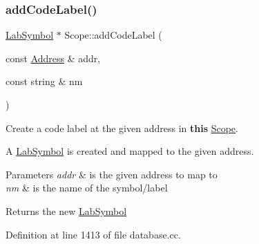 \subsubsection{\texorpdfstring{addCodeLabel()}{addCodeLabel()}}
{\footnotesize\ttfamily \mbox{\hyperlink{class_lab_symbol}{Lab\+Symbol}} $\ast$ Scope\+::add\+Code\+Label (\begin{DoxyParamCaption}\item[{const \mbox{\hyperlink{class_address}{Address}} \&}]{addr,  }\item[{const string \&}]{nm }\end{DoxyParamCaption})}



Create a code label at the given address in {\bfseries{this}} \mbox{\hyperlink{class_scope}{Scope}}. 

A \mbox{\hyperlink{class_lab_symbol}{Lab\+Symbol}} is created and mapped to the given address. 
\begin{DoxyParams}{Parameters}
{\em addr} & is the given address to map to \\
\hline
{\em nm} & is the name of the symbol/label \\
\hline
\end{DoxyParams}
\begin{DoxyReturn}{Returns}
the new \mbox{\hyperlink{class_lab_symbol}{Lab\+Symbol}} 
\end{DoxyReturn}


Definition at line 1413 of file database.\+cc.

